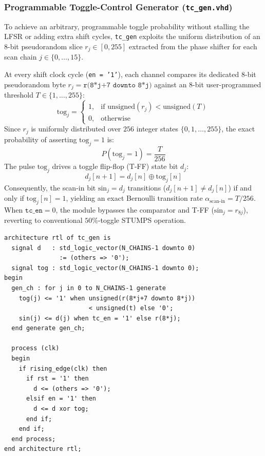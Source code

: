 \documentclass[conference]{IEEEtran}
\begin{document}
\subsubsection{Programmable Toggle-Control Generator (\texttt{tc\_gen.vhd})}
To achieve an arbitrary, programmable toggle probability without stalling the LFSR or adding extra shift cycles, \texttt{tc\_gen} exploits the uniform distribution of an 8-bit pseudorandom slice $r_j \in [0, 255]$ extracted from the phase shifter for each scan chain $j \in \{0, \dots, 15\}$.

At every shift clock cycle (\texttt{en = '1'}), each channel compares its dedicated 8-bit pseudorandom byte $r_j = \texttt{r(8*j+7 downto 8*j)}$ against an 8-bit user-programmed threshold $T \in \{1, \dots, 255\}$:
\begin{equation}
    \text{tog}_j =
    \begin{cases}
        1, & \text{if } \text{unsigned}(r_j) < \text{unsigned}(T) \\
        0, & \text{otherwise}
    \end{cases}
    \label{eq:comp}
\end{equation}
Since $r_j$ is uniformly distributed over $256$ integer states $\{0, 1, \dots, 255\}$, the exact probability of asserting $\text{tog}_j = 1$ is:
\begin{equation}
    P(\text{tog}_j = 1) = \frac{T}{256}
    \label{eq:prob}
\end{equation}
The pulse $\text{tog}_j$ drives a toggle flip-flop (T-FF) state bit $d_j$:
\begin{equation}
    d_j[n+1] = d_j[n] \oplus \text{tog}_j[n]
    \label{eq:tff}
\end{equation}
Consequently, the scan-in bit $\text{sin}_j = d_j$ transitions ($d_j[n+1] \neq d_j[n]$) if and only if $\text{tog}_j[n] = 1$, yielding an exact Bernoulli transition rate $\alpha_{\text{scan-in}} = T/256$. When $\texttt{tc\_en} = 0$, the module bypasses the comparator and T-FF ($\text{sin}_j = r_{8j}$), reverting to conventional $50\%$-toggle STUMPS operation.

\begin{lstlisting}[style=vhdlstyle, caption={Synthesizable RTL of \texttt{tc\_gen.vhd}.}]
architecture rtl of tc_gen is
  signal d   : std_logic_vector(N_CHAINS-1 downto 0)
               := (others => '0');
  signal tog : std_logic_vector(N_CHAINS-1 downto 0);
begin
  gen_ch : for j in 0 to N_CHAINS-1 generate
    tog(j) <= '1' when unsigned(r(8*j+7 downto 8*j))
                       < unsigned(t) else '0';
    sin(j) <= d(j) when tc_en = '1' else r(8*j);
  end generate gen_ch;

  process (clk)
  begin
    if rising_edge(clk) then
      if rst = '1' then
        d <= (others => '0');
      elsif en = '1' then
        d <= d xor tog;
      end if;
    end if;
  end process;
end architecture rtl;
\end{lstlisting}
\end{document}
